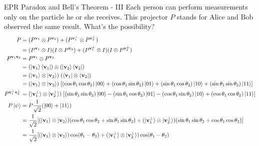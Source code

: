 \documentclass{beamer}
\begin{document}
\begin{frame}{EPR Paradox and Bell's Theorem - III\tiny{\cite{solutionofexercise420}}}
  {\tiny
    Each person can perform measurements only on the particle he or she receives.
    This projector $P$ stands for Alice and Bob observed the same result. What's the possibility?
    \begin{align*}
      P &=
      (P^{\mathbf{v}_1} \otimes P^{\mathbf{v}_2}) +
      (P^{\mathbf{v}_1^{\perp}} \otimes P^{\mathbf{v}_2^{\perp}}) \\
        &= (P^{\mathbf{v}_1} \otimes I)(I \otimes P^{\mathbf{v}_2}) +
           (P^{\mathbf{v}_1^{\perp}} \otimes I) (I \otimes P^{\mathbf{v}_2^{\perp}}) \\
      P^{\mathbf{v}_1\mathbf{v}_2} &= P^{\mathbf{v}_1} \otimes P^{\mathbf{v}_2} \\
      &= (\ket{\mathbf{v}_1}\bra{\mathbf{v}_1}) \otimes (\ket{\mathbf{v}_2}\bra{\mathbf{v}_2}) \\
      &= (\ket{\mathbf{v}_1} \otimes \ket{\mathbf{v}_2}) \; (\bra{\mathbf{v}_1} \otimes \bra{\mathbf{v}_2}) \\
      &= (\ket{\mathbf{v}_1} \otimes \ket{\mathbf{v}_2}) \;
         [
           (\cos \theta_1 \cos \theta_2) \ket{00}
         + (\cos \theta_1 \sin \theta_2) \ket{01}
         + (\sin \theta_1 \cos \theta_2) \ket{10}
         + (\sin \theta_1 \sin \theta_2) \ket{11}
         ]
      \\
      P^{\mathbf{v}_1^{\perp} \mathbf{v}_2^{\perp}} &= 
         (\ket{\mathbf{v}_1^{\perp}} \otimes \ket{\mathbf{v}_2^{\perp}}) \;
         [
           (\sin \theta_1 \sin\theta_2) \ket{00}
         - (\sin \theta_1 \cos \theta_2) \ket{01}
         - (\cos \theta_1 \sin \theta_2) \ket{10}
         + (\cos \theta_1 \cos \theta_2) \ket{11}
         ]
      \\
      P\ket{\psi} &= P \frac{1}{\sqrt2} (\ket{00} + \ket{11}) \\
      &= \frac{1}{\sqrt2} 
                     [
                       (\ket{\mathbf{v}_1} \otimes \ket{\mathbf{v}_2}) (\cos \theta_1 \cos \theta_2 + \sin \theta_1 \sin \theta_2)
                     + (\ket{\mathbf{v}_1^{\perp}} \otimes \ket{\mathbf{v}_2^{\perp}}) (\sin \theta_1 \sin\theta_2 + \cos \theta_1 \cos \theta_2)
                     ] \\
      &= \frac{1}{\sqrt2} 
         [
           (\ket{\mathbf{v}_1} \otimes \ket{\mathbf{v}_2}) \cos (\theta_1 - \theta_2) 
         + (\ket{\mathbf{v}_1^{\perp}} \otimes \ket{\mathbf{v}_2^{\perp}}) \cos (\theta_1 - \theta_2)

\end{align*}}
\end{frame}
\end{document}
